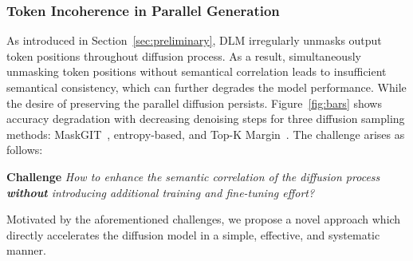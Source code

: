 \subsubsection{Token Incoherence in Parallel Generation}\label{sec:incor}

As introduced in Section~\ref{sec:preliminary}, DLM irregularly unmasks output token positions throughout diffusion process. As a result, simultaneously unmasking token positions without semantical correlation leads to insufficient semantical consistency, which can further degrades the model performance. 
While the desire of preserving the parallel diffusion persists. Figure~\ref{fig:bars} shows accuracy degradation with decreasing denoising steps for three diffusion sampling methods: MaskGIT~\cite{chang2022maskgitmaskedgenerativeimage}, entropy-based, and Top-K Margin~\cite{kim2025trainworstplanbest_topkmargin}.  The challenge arises as follows: 

\textbf{Challenge} \textit{How to enhance the semantic correlation of the diffusion process \textbf{ without} introducing additional training and fine-tuning effort? }

Motivated by the aforementioned challenges, we propose a novel approach which directly accelerates the diffusion model in a simple, effective, and systematic manner. 



